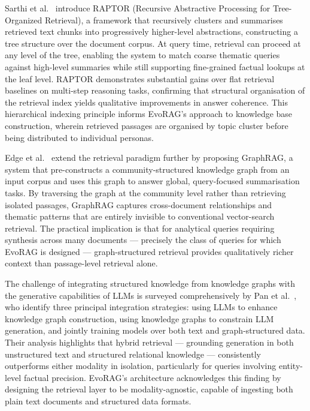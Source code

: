 Sarthi et al.~\cite{sarthi2024raptor} introduce RAPTOR (Recursive Abstractive
Processing for Tree-Organized Retrieval), a framework that recursively clusters
and summarises retrieved text chunks into progressively higher-level abstractions,
constructing a tree structure over the document corpus.
At query time, retrieval can proceed at any level of the tree, enabling the system
to match coarse thematic queries against high-level summaries while still supporting
fine-grained factual lookups at the leaf level.
RAPTOR demonstrates substantial gains over flat retrieval baselines on multi-step
reasoning tasks, confirming that structural organisation of the retrieval index
yields qualitative improvements in answer coherence.
This hierarchical indexing principle informs EvoRAG's approach to knowledge base
construction, wherein retrieved passages are organised by topic cluster before
being distributed to individual personas.

Edge et al.~\cite{edge2024graphrag} extend the retrieval paradigm further by
proposing GraphRAG, a system that pre-constructs a community-structured knowledge
graph from an input corpus and uses this graph to answer global, query-focused
summarisation tasks.
By traversing the graph at the community level rather than retrieving isolated
passages, GraphRAG captures cross-document relationships and thematic patterns
that are entirely invisible to conventional vector-search retrieval.
The practical implication is that for analytical queries requiring synthesis across
many documents — precisely the class of queries for which EvoRAG is designed —
graph-structured retrieval provides qualitatively richer context than passage-level
retrieval alone.

The challenge of integrating structured knowledge from knowledge graphs with the
generative capabilities of LLMs is surveyed comprehensively by
Pan et al.~\cite{pan2024unifying}, who identify three principal integration
strategies: using LLMs to enhance knowledge graph construction, using knowledge
graphs to constrain LLM generation, and jointly training models over both text and
graph-structured data.
Their analysis highlights that hybrid retrieval — grounding generation in both
unstructured text and structured relational knowledge — consistently outperforms
either modality in isolation, particularly for queries involving entity-level
factual precision.
EvoRAG's architecture acknowledges this finding by designing the retrieval layer
to be modality-agnostic, capable of ingesting both plain text documents and
structured data formats.

